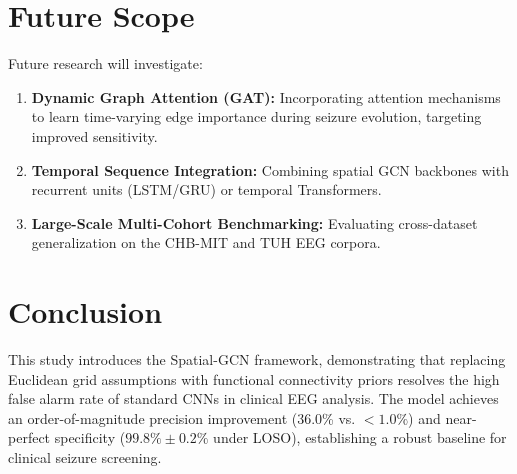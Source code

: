 \documentclass[journal]{IEEEtran}
\begin{document}
\section{Future Scope}
Future research will investigate:
\begin{enumerate}
    \item \textbf{Dynamic Graph Attention (GAT):} Incorporating attention mechanisms to learn time-varying edge importance during seizure evolution, targeting improved sensitivity.
    \item \textbf{Temporal Sequence Integration:} Combining spatial GCN backbones with recurrent units (LSTM/GRU) or temporal Transformers.
    \item \textbf{Large-Scale Multi-Cohort Benchmarking:} Evaluating cross-dataset generalization on the CHB-MIT and TUH EEG corpora.
\end{enumerate}

\section{Conclusion}
This study introduces the Spatial-GCN framework, demonstrating that replacing Euclidean grid assumptions with functional connectivity priors resolves the high false alarm rate of standard CNNs in clinical EEG analysis. The model achieves an order-of-magnitude precision improvement (36.0\% vs. $<1.0\%$) and near-perfect specificity ($99.8\% \pm 0.2\%$ under LOSO), establishing a robust baseline for clinical seizure screening.
\end{document}
